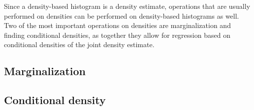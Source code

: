 \documentclass[../mapped-regular-pavings.tex]{subfiles}
\begin{document}
  Since a density-based histogram is a density estimate,
  operations that are usually performed on densities can
  be performed on density-based histograms as well.
  Two of the most important operations on densities are
  marginalization and finding conditional densities, 
  as together they allow for regression based on 
  conditional densities of the joint density estimate.

  \subsection{Marginalization}
    

  \subsection{Conditional density}
    
\end{document}
